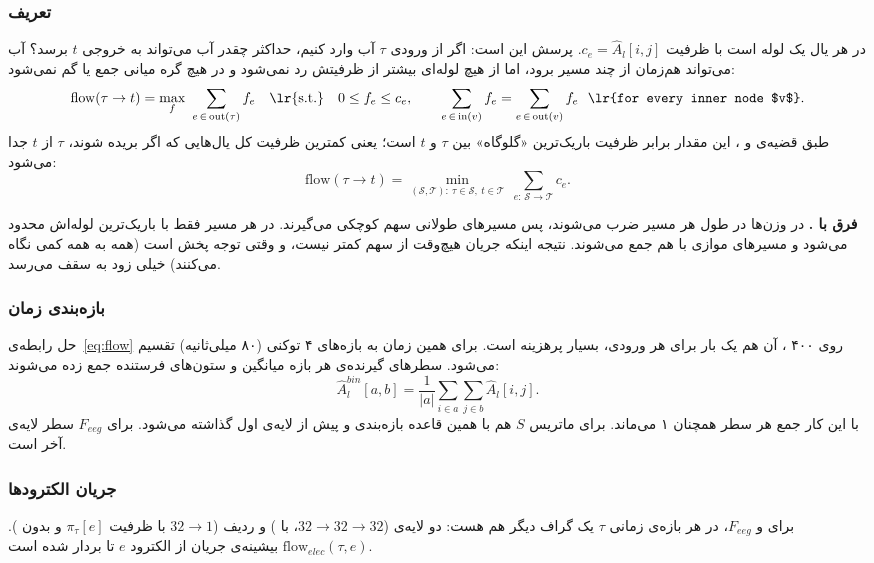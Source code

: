 \subsubsection*{تعریف}
در  هر یال  یک لوله است با ظرفیت $c_e=\hat A_l[i,j]$. پرسش این است: اگر از ورودی $\tau$ آب وارد کنیم، حداکثر چقدر آب می‌تواند به خروجی $t$ برسد؟ آب می‌تواند هم‌زمان از چند مسیر برود، اما از هیچ لوله‌ای بیشتر از ظرفیتش رد نمی‌شود و در هیچ گره میانی جمع یا گم نمی‌شود:
\begin{equation}
\mathrm{flow}(\tau\to t)=\max_{f}\ \sum_{e\,\in\,\mathrm{out}(\tau)} f_e
\quad\text{\lr{s.t.}}\quad 0\le f_e\le c_e,\qquad \sum_{e\,\in\,\mathrm{in}(v)}f_e=\sum_{e\,\in\,\mathrm{out}(v)}f_e\ \ \text{\lr{for every inner node $v$}} .
\label{eq:flow}
\end{equation}
طبق قضیه‌ی  و ، این مقدار برابر ظرفیت باریک‌ترین «گلوگاه» بین $\tau$ و $t$ است؛ یعنی کمترین ظرفیت کل یال‌هایی که اگر بریده شوند، $\tau$ از $t$ جدا می‌شود:
\begin{equation}
\mathrm{flow}(\tau\to t)=\min_{(\mathcal{S},\mathcal{T}):\ \tau\in\mathcal{S},\ t\in\mathcal{T}}\ \sum_{e:\,\mathcal{S}\to\mathcal{T}}c_e .
\end{equation}

\textbf{فرق با .} در  وزن‌ها در طول هر مسیر ضرب می‌شوند، پس مسیرهای طولانی سهم کوچکی می‌گیرند. در  هر مسیر فقط با باریک‌ترین لوله‌اش محدود می‌شود و مسیرهای موازی با هم جمع می‌شوند. نتیجه اینکه جریان هیچ‌وقت از سهم  کمتر نیست، و وقتی توجه پخش است (همه به همه کمی نگاه می‌کنند) خیلی زود به سقف می‌رسد.

\subsubsection*{بازه‌بندی زمان}
حل رابطه‌ی~\eqref{eq:flow} روی ۴۰۰ ، آن هم یک بار برای هر ورودی، بسیار پرهزینه است. برای همین زمان به بازه‌های ۴ توکنی (۸۰ میلی‌ثانیه) تقسیم می‌شود. سطرهای گیرنده‌ی هر بازه میانگین و ستون‌های فرستنده جمع زده می‌شوند:
\begin{equation}
\hat A^{bin}_l[a,b]=\frac{1}{|a|}\sum_{i\in a}\sum_{j\in b}\hat A_l[i,j].
\end{equation}
با این کار جمع هر سطر همچنان ۱ می‌ماند. برای  ماتریس  $S$ هم با همین قاعده بازه‌بندی و پیش از لایه‌ی اول گذاشته می‌شود. برای $F_{eeg}$ سطر  لایه‌ی آخر است.

\subsubsection*{جریان الکترودها}
برای  و $F_{eeg}$، در هر بازه‌ی زمانی $\tau$ یک گراف دیگر هم هست: دو لایه‌ی  ($32\to32\to32$، با ) و ردیف  ($32\to1$ با ظرفیت $\pi_\tau[e]$ و بدون ). $\mathrm{flow}_{elec}(\tau,e)$ بیشینه‌ی جریان از الکترود $e$ تا بردار ‌شده است.

